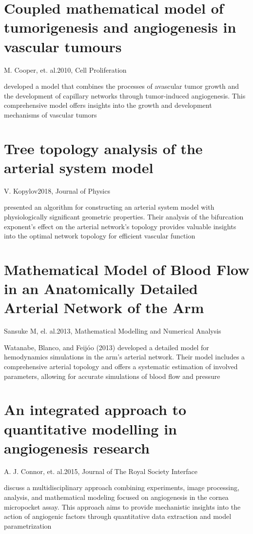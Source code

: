 \section{Coupled mathematical model of tumorigenesis and angiogenesis in vascular tumours}{M. Cooper, et. al.}{2010, Cell Proliferation}

developed a model that combines the processes of avascular tumor growth and the development of capillary networks through tumor-induced angiogenesis. This comprehensive model offers insights into the growth and development mechanisms of vascular tumors \cite{Cooper2010}

\section{Tree topology analysis of the arterial system model}{V. Kopylov}{2018, Journal of Physics}

presented an algorithm for constructing an arterial system model with physiologically significant geometric properties. Their analysis of the bifurcation exponent's effect on the arterial network's topology provides valuable insights into the optimal network topology for efficient vascular function  \cite{Kopylova2018}

\section{Mathematical Model of Blood Flow in an Anatomically Detailed Arterial Network of the Arm}{Sansuke M, el. al.}{2013, Mathematical Modelling and Numerical Analysis}

Watanabe, Blanco, and Feijóo (2013) developed a detailed model for hemodynamics simulations in the arm's arterial network. Their model includes a comprehensive arterial topology and offers a systematic estimation of involved parameters, allowing for accurate simulations of blood flow and pressure \cite{Watanabe2013}


\section{An integrated approach to quantitative modelling in angiogenesis research}{A. J. Connor, et. al.}{2015, Journal of The Royal Society Interface}

discuss a multidisciplinary approach combining experiments, image processing, analysis, and mathematical modeling focused on angiogenesis in the cornea micropocket assay. This approach aims to provide mechanistic insights into the action of angiogenic factors through quantitative data extraction and model parametrization \cite{Connor2015}


